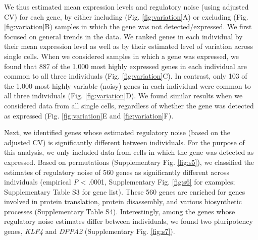 We thus estimated mean expression levels and regulatory noise (using
adjusted CV) for each gene, by either including (Fig. \ref{fig:variation}A) or excluding
(Fig. \ref{fig:variation}B) samples in which the gene was not detected/expressed. We first
focused on general trends in the data. We ranked genes in each
individual by their mean expression level as well as by their estimated
level of variation across single cells. When we considered samples in
which a gene was expressed, we found that 887 of the 1,000 most highly
expressed genes in each individual are common to all three individuals
(Fig. \ref{fig:variation}C). In contrast, only 103 of the 1,000 most highly variable
(noisy) genes in each individual were common to all three individuals
(Fig. \ref{fig:variation}D). We found similar results when we considered data from all
single cells, regardless of whether the gene was detected as expressed
(Fig. \ref{fig:variation}E and \ref{fig:variation}F).

Next, we identified genes whose estimated regulatory noise (based on the
adjusted CV) is significantly different between individuals. For the
purpose of this analysis, we only included data from cells in which the
gene was detected as expressed. Based on permutations (Supplementary
Fig. \ref{fig:s5}), we classified the estimates of regulatory noise of 560 genes
as significantly different across individuals (empirical \emph{P}
\textless{} .0001, Supplementary Fig. \ref{fig:s6} for examples; Supplementary
Table S3 for gene list). These 560 genes are enriched for genes involved
in protein translation, protein disassembly, and various biosynthetic
processes (Supplementary Table S4). Interestingly, among the genes whose
regulatory noise estimates differ between individuals, we found two
pluripotency genes, \emph{KLF4} and \emph{DPPA2} (Supplementary Fig.
\ref{fig:s7}).

